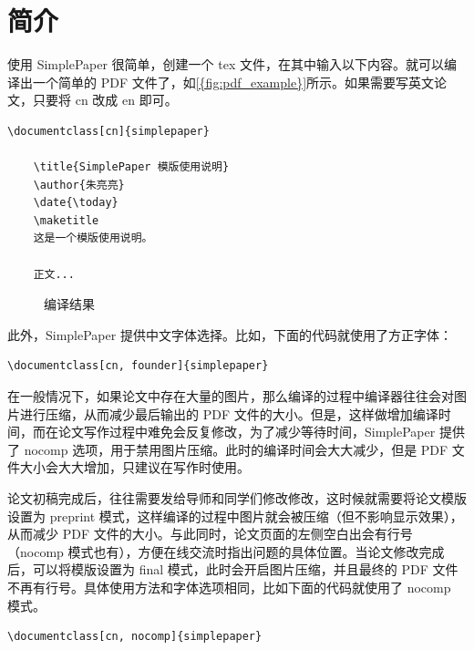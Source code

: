 \section{简介}
使用 SimplePaper 很简单，创建一个 tex 文件，在其中输入以下内容。就可以编译出一个简单的 PDF 文件了，如\cref{{fig:pdf_example}}所示。如果需要写英文论文，只要将 cn 改成 en 即可。

\begin{lstlisting}
\documentclass[cn]{simplepaper}

    \title{SimplePaper 模版使用说明}
    \author{朱亮亮}
    \date{\today}
    \maketitle
    这是一个模版使用说明。

    正文...

\end{lstlisting}
\begin{figure}[htb!]
    \centering
    \caption{编译结果}
    \label{fig:pdf_example}
\end{figure}
此外，SimplePaper 提供中文字体选择。比如，下面的代码就使用了方正字体：
\begin{lstlisting}
\documentclass[cn, founder]{simplepaper}
\end{lstlisting}

在一般情况下，如果论文中存在大量的图片，那么编译的过程中编译器往往会对图片进行压缩，从而减少最后输出的 PDF 文件的大小。但是，这样做增加编译时间，而在论文写作过程中难免会反复修改，为了减少等待时间，SimplePaper 提供了 nocomp 选项，用于禁用图片压缩。此时的编译时间会大大减少，但是 PDF 文件大小会大大增加，只建议在写作时使用。

论文初稿完成后，往往需要发给导师和同学们修改修改，这时候就需要将论文模版设置为 preprint 模式，这样编译的过程中图片就会被压缩（但不影响显示效果），从而减少 PDF 文件的大小。与此同时，论文页面的左侧空白出会有行号（nocomp 模式也有），方便在线交流时指出问题的具体位置。当论文修改完成后，可以将模版设置为 final 模式，此时会开启图片压缩，并且最终的 PDF 文件不再有行号。具体使用方法和字体选项相同，比如下面的代码就使用了 nocomp 模式。
\begin{lstlisting}
\documentclass[cn, nocomp]{simplepaper}
\end{lstlisting}


